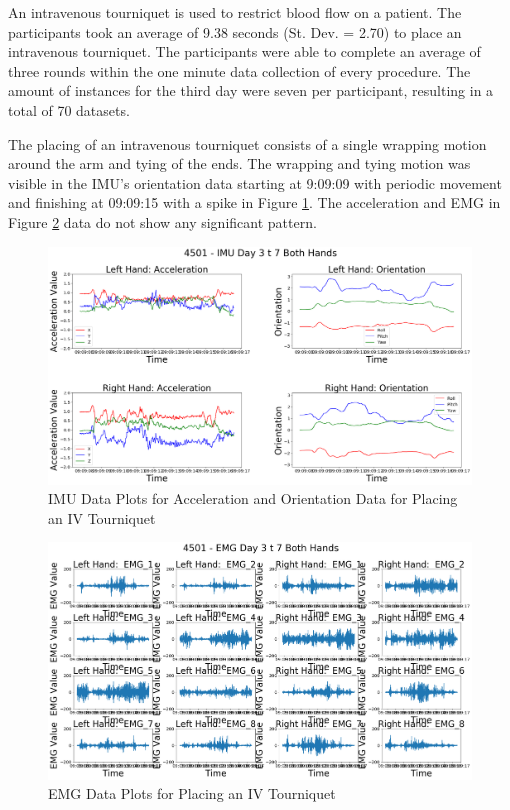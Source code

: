 An intravenous tourniquet is used to restrict blood flow on a patient. The participants took an average of 9.38 seconds (St. Dev. = 2.70) to place an intravenous tourniquet. The participants were able to complete an average of three rounds within the one minute data collection of every procedure. The amount of instances for the third day were seven per participant, resulting in a total of 70 datasets.
\par The placing of an intravenous tourniquet consists of a single wrapping motion around the arm and tying of the ends. The wrapping and tying motion was visible in the IMU's orientation data starting at 9:09:09 with periodic movement and finishing at 09:09:15 with a spike in Figure \ref{fig:4501imuday3t7}. The acceleration and EMG in Figure \ref{fig:4501emgday3t7} data do not show any significant pattern.
\begin{figure}[!h]
	\centering
	\includegraphics[width=\linewidth]{pictures/4501_IMU_Day3_t_7}
	\caption{IMU Data Plots for Acceleration and Orientation Data for Placing an IV Tourniquet}
	\label{fig:4501imuday3t7}
\end{figure}
\begin{figure}[!h]
	\centering
	\includegraphics[width=\linewidth]{pictures/4501_EMG_Day3_t_7}
	\caption{EMG Data Plots for Placing an IV Tourniquet}
	\label{fig:4501emgday3t7}
\end{figure}

